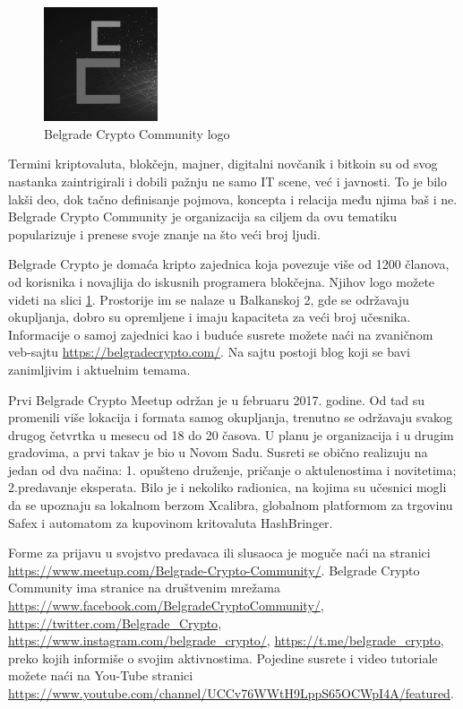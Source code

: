 \documentclass[a4paper]{article}
\begin{document}
{\begin{figure}[h]
  \centering
  \includegraphics[width=0.3\textwidth]{bcc_logo.png}
  \caption{Belgrade Crypto Community logo}
  \label{fig:bgdcclogo}
\end{figure}

Termini  kriptovaluta, blokčejn, majner, digitalni novčanik i bitkoin su od svog nastanka zaintrigirali i dobili pažnju ne samo IT scene, već i javnosti. To je bilo lakši deo, dok tačno definisanje pojmova, koncepta i relacija među njima baš i ne. Belgrade Crypto Community je organizacija sa ciljem da ovu tematiku popularizuje i prenese svoje znanje na što veći broj ljudi.

Belgrade Crypto je domaća kripto zajednica koja povezuje više od 1200 članova, od korisnika i novajlija do iskusnih programera blokčejna. Njihov logo možete videti na slici \ref{fig:bgdcclogo}. Prostorije im se nalaze u Balkanskoj 2, gde se održavaju okupljanja, dobro su opremljene i imaju kapaciteta za veći broj učesnika. Informacije o samoj zajednici kao i buduće susrete možete naći na zvaničnom veb-sajtu \url{https://belgradecrypto.com/}. Na sajtu postoji blog koji se bavi zanimljivim i aktuelnim temama.

Prvi Belgrade Crypto Meetup održan je u februaru 2017. godine. Od tad su promenili više lokacija i formata samog okupljanja, trenutno se održavaju svakog drugog četvrtka u mesecu od 18 do 20 časova. U planu je organizacija i u drugim gradovima, a prvi takav je bio u Novom Sadu. Susreti se obično realizuju na jedan od dva načina: 1. opušteno druženje, pričanje o aktulenostima i novitetima; 2.predavanje eksperata. Bilo je i nekoliko radionica, na kojima su učesnici mogli  da se upoznaju sa lokalnom berzom Xcalibra, globalnom platformom za trgovinu Safex i automatom za kupovinom kritovaluta HashBringer. 

Forme za prijavu u svojstvo predavaca ili slusaoca je moguče naći na stranici \url{https://www.meetup.com/Belgrade-Crypto-Community/}. Belgrade Crypto Community ima stranice na društvenim mrežama \url{https://www.facebook.com/BelgradeCryptoCommunity/}, \url{https://twitter.com/Belgrade_Crypto}, \url{https://www.instagram.com/belgrade_crypto/}, \url{https://t.me/belgrade_crypto}, preko kojih informiše o svojim aktivnostima. Pojedine susrete i video tutoriale možete naći na You-Tube stranici \url{https://www.youtube.com/channel/UCCv76WWtH9LppS65OCWpI4A/featured}.


}
\end{document}
